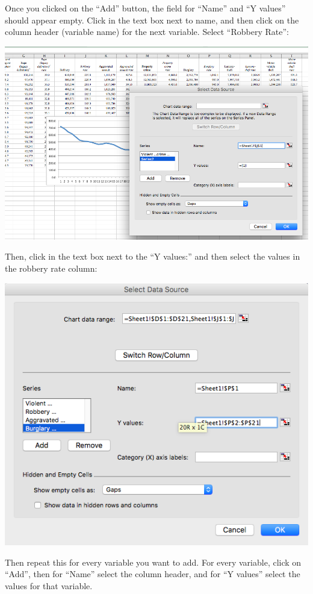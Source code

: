 \documentclass[]{book}
\theoremstyle{definition}
\theoremstyle{definition}
\theoremstyle{definition}
\theoremstyle{remark}
\begin{document}
Once you clicked on the ``Add'' button, the field for ``Name'' and ``Y
values'' should appear empty. Click in the text box next to name, and
then click on the column header (variable name) for the next variable.
Select ``Robbery Rate'':

\includegraphics{imgs/comp_c_3.png}

Then, click in the text box next to the ``Y values:'' and then select
the values in the robbery rate column:

\includegraphics{imgs/comp_c_4.png}

Then repeat this for every variable you want to add. For every variable,
click on ``Add'', then for ``Name'' select the column header, and for
``Y values'' select the values for that variable.
\end{document}
